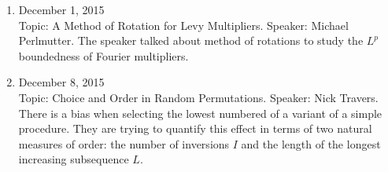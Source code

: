 \documentclass{article}
\begin{document}
\begin{enumerate}
\item December 1, 2015  \\
Topic: A Method of Rotation for Levy Multipliers. Speaker: Michael Perlmutter. 
The speaker talked about method of rotations to study the $L^p$ boundedness of Fourier multipliers. 

\item  December 8, 2015 \\
Topic: Choice and Order in Random Permutations.  Speaker: Nick Travers. 
There is a bias when selecting the lowest numbered of a variant of a simple procedure. They are trying to quantify this effect in terms of two natural measures of order: the number of inversions $I$ and the length of the longest increasing subsequence $L$.  


\end{enumerate}
\end{document}
